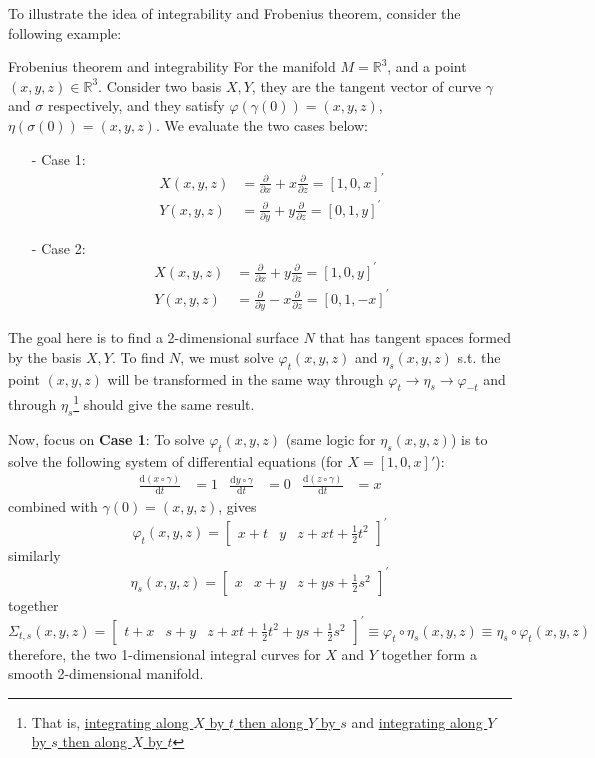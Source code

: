 To illustrate the idea of integrability and Frobenius theorem, consider the following example:
\begin{example}{Frobenius theorem and integrability}
    For the manifold $M=\mathbb{R}^3$, and a point $(x,y,z)\in \mathbb{R}^3$. Consider two basis $X,Y$, they are the tangent vector of curve $\gamma$ and $\sigma$ respectively, and they satisfy $\varphi(\gamma(0))=(x,y,z)$, $\eta(\sigma(0))=(x,y,z)$. We evaluate the two cases below:
    \begin{enumerate}
        \item[-] Case 1: 
        \begin{align*}
            X(x,y,z) &= \frac{\partial}{\partial x}+x\frac{\partial}{\partial z} = [1,0,x]^{\prime}\\
            Y(x,y,z) &= \frac{\partial}{\partial y}+y\frac{\partial}{\partial z} = [0,1,y]^{\prime}
        \end{align*} 
        \item[-] Case 2:  
        \begin{align*}
            X(x,y,z) &= \frac{\partial}{\partial x}+y\frac{\partial}{\partial z} = [1,0,y]^{\prime}\\
            Y(x,y,z) &= \frac{\partial}{\partial y}-x\frac{\partial}{\partial z} = [0,1,-x]^{\prime}
        \end{align*}  
    \end{enumerate}
\end{example}
The goal here is to find a 2-dimensional surface $N$ that has tangent spaces formed by the basis $X,Y$. To find $N$, we must solve $\varphi_t(x,y,z)$ and $\eta_s(x,y,z)$ s.t. the point $(x,y,z)$ will be transformed in the same way through $\varphi_t\rightarrow \eta_s\rightarrow \varphi_{-t}$ and through $\eta_s$\footnote{That is, \underline{integrating along $X$ by $t$ then along $Y$ by $s$} and \underline{integrating along $Y$ by $s$ then along $X$ by $t$}} should give the same result.

Now, focus on \textbf{Case 1}: To solve $\varphi_t(x,y,z)$ (same logic for $\eta_s(x,y,z)$) is to solve the following system of differential equations (for $X=[1,0,x]'$):
\begin{align*}
    \frac{\mathrm{d}(x\circ \gamma)}{\mathrm{d}t} &=1 & \frac{\mathrm{d}y\circ\gamma }{\mathrm{d} t}&=0 & \frac{\mathrm{d}(z\circ\gamma)}{\mathrm{d}t}&=x
\end{align*}
combined with $\gamma(0)=(x,y,z)$, gives
$$
\varphi_t(x,y,z) = \begin{bmatrix}x+t & y & z+xt+\frac{1}{2}t^2\end{bmatrix}^{\prime}
$$
similarly
$$
\eta_s(x,y,z) = \begin{bmatrix}x & x+y & z+ys+\frac{1}{2}s^2\end{bmatrix}^{\prime}
$$
together
$$
\Sigma_{t,s}(x,y,z) = \begin{bmatrix}t+x & s+y & z+xt+\frac{1}{2}t^2 + ys+\frac{1}{2}s^2\end{bmatrix}^{\prime} \equiv \varphi_t\circ\eta_s(x,y,z) \equiv \eta_s\circ\varphi_t(x,y,z)
$$
therefore, the two 1-dimensional integral curves for $X$ and $Y$ together form a smooth 2-dimensional manifold.

